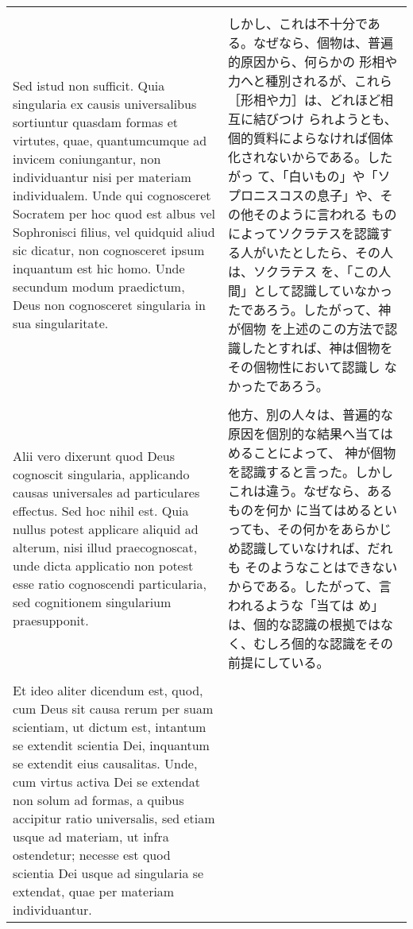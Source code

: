 \documentclass[10pt]{jsarticle} %
\begin{document}
\begin{longtable}{p{21em}p{21em}}
\\
\\
 
Sed istud non sufficit. Quia singularia ex causis universalibus
sortiuntur quasdam formas et virtutes, quae, quantumcumque ad invicem
coniungantur, non individuantur nisi per materiam individualem. Unde
qui cognosceret Socratem per hoc quod est albus vel Sophronisci
filius, vel quidquid aliud sic dicatur, non cognosceret ipsum
inquantum est hic homo. Unde secundum modum praedictum, Deus non
cognosceret singularia in sua singularitate.

&

しかし、これは不十分である。なぜなら、個物は、普遍的原因から、何らかの
形相や力へと種別されるが、これら［形相や力］は、どれほど相互に結びつけ
られようとも、個的質料によらなければ個体化されないからである。したがっ
て、「白いもの」や「ソプロニスコスの息子」や、その他そのように言われる
ものによってソクラテスを認識する人がいたとしたら、その人は、ソクラテス
を、「この人間」として認識していなかったであろう。したがって、神が個物
を上述のこの方法で認識したとすれば、神は個物をその個物性において認識し
なかったであろう。

\\
\\


Alii vero dixerunt quod Deus cognoscit singularia, applicando causas
universales ad particulares effectus. Sed hoc nihil est. Quia nullus
potest applicare aliquid ad alterum, nisi illud praecognoscat, unde
dicta applicatio non potest esse ratio cognoscendi particularia, sed
cognitionem singularium praesupponit.


&

他方、別の人々は、普遍的な原因を個別的な結果へ当てはめることによって、
神が個物を認識すると言った。しかしこれは違う。なぜなら、あるものを何か
に当てはめるといっても、その何かをあらかじめ認識していなければ、だれも
そのようなことはできないからである。したがって、言われるような「当ては
め」は、個的な認識の根拠ではなく、むしろ個的な認識をその前提にしている。

\\
\\

Et ideo aliter dicendum est, quod, cum Deus sit causa rerum per suam
scientiam, ut dictum est, intantum se extendit scientia Dei, inquantum
se extendit eius causalitas. Unde, cum virtus activa Dei se extendat
non solum ad formas, a quibus accipitur ratio universalis, sed etiam
usque ad materiam, ut infra ostendetur; necesse est quod scientia Dei
usque ad singularia se extendat, quae per materiam individuantur.


\end{longtable}
\end{document}
